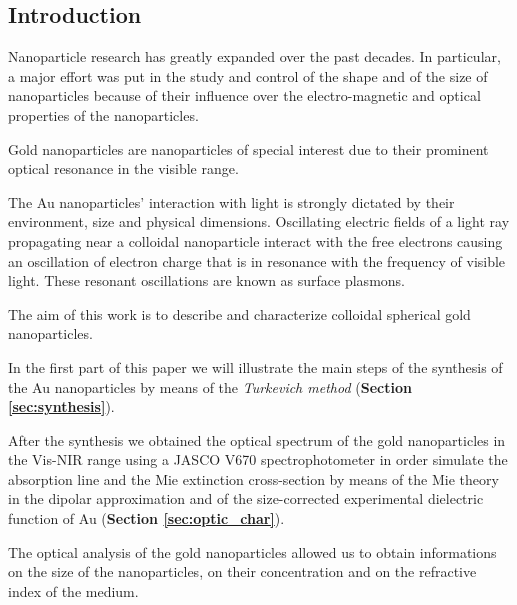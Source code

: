 \documentclass[twocolumn]{article}
\title{}
\author{}
\date{}
\begin{document}
\thispagestyle{fancy}

\thispagestyle{empty}

\tableofcontents

\noindent\makebox[\linewidth]{\color{linescolor} \rule[-0.2cm]{0.85\paperwidth}{1pt}}
\noindent\makebox[\linewidth]{\color{linescolor} \rule[0.3cm]{0.85\paperwidth}{1.2 pt}}


\begin{multicols}{2}
\section{Introduction}
\noindent
Nanoparticle research has greatly expanded over the past decades. 
In particular, a major effort was put in the study and control of the shape and of the size of nanoparticles because of their influence over the electro-magnetic and optical properties of the nanoparticles.

Gold nanoparticles are nanoparticles of special interest due to their prominent optical resonance in the visible range.

The Au nanoparticles' interaction with light is strongly dictated by their environment, size and physical dimensions. Oscillating electric fields of a light ray propagating near a colloidal nanoparticle interact with the free electrons causing an oscillation of electron charge that is in resonance with the frequency of visible light. These resonant oscillations are known as surface plasmons. 

The aim of this work is to describe and characterize colloidal spherical gold nanoparticles. 

In the first part of this paper we will illustrate the main steps of the synthesis of the Au nanoparticles by means of the \textit{Turkevich method} (\textbf{Section \ref{sec:synthesis}}). 

After the synthesis we obtained the optical spectrum of the gold nanoparticles in the Vis-NIR range using a JASCO V670 spectrophotometer in order simulate the absorption line and the Mie extinction cross-section by means of the Mie theory in the dipolar approximation and of the size-corrected experimental dielectric function of Au (\textbf{Section \ref{sec:optic_char}}). 

The optical analysis of the gold nanoparticles allowed us to obtain informations on the size of the nanoparticles, on their concentration and on the refractive index of the medium.


\end{multicols}
\end{document}
